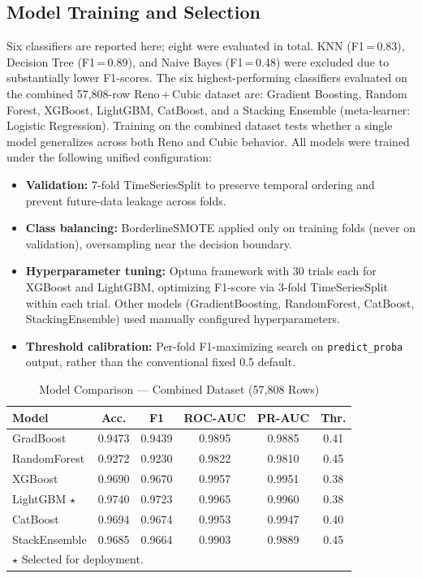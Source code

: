 \documentclass[journal]{IEEEtran}
\begin{document}
\subsection{Model Training and Selection}

Six classifiers are reported here; eight were evaluated in total. KNN (F1\,=\,0.83), Decision Tree (F1\,=\,0.89), and Naive Bayes (F1\,=\,0.48) were excluded due to substantially lower F1-scores. The six highest-performing classifiers evaluated on the combined 57,808-row Reno\,+\,Cubic dataset are: Gradient Boosting, Random Forest, XGBoost, LightGBM, CatBoost, and a Stacking Ensemble (meta-learner: Logistic Regression). Training on the combined dataset tests whether a single model generalizes across both Reno and Cubic behavior. All models were trained under the following unified configuration:

\begin{itemize}
  \item \textbf{Validation:} 7-fold TimeSeriesSplit to preserve temporal ordering and prevent future-data leakage across folds.
  \item \textbf{Class balancing:} BorderlineSMOTE applied only on training folds (never on validation), oversampling near the decision boundary.
  \item \textbf{Hyperparameter tuning:} Optuna framework with 30 trials each for XGBoost and LightGBM, optimizing F1-score via 3-fold TimeSeriesSplit within each trial. Other models (GradientBoosting, RandomForest, CatBoost, StackingEnsemble) used manually configured hyperparameters.
  \item \textbf{Threshold calibration:} Per-fold F1-maximizing search on \texttt{predict\_proba} output, rather than the conventional fixed 0.5 default.
\end{itemize}

\begin{table}[!t]
\renewcommand{\arraystretch}{1.3}
\caption{Model Comparison --- Combined Dataset (57,808 Rows)}
\label{tab:models}
\centering
\begin{tabular}{lccccc}
\toprule
\textbf{Model} & \textbf{Acc.} & \textbf{F1} & \textbf{ROC-AUC} & \textbf{PR-AUC} & \textbf{Thr.} \\
\midrule
GradBoost      & 0.9473 & 0.9439 & 0.9895 & 0.9885 & 0.41 \\
RandomForest   & 0.9272 & 0.9230 & 0.9822 & 0.9810 & 0.45 \\
XGBoost        & 0.9690 & 0.9670 & 0.9957 & 0.9951 & 0.38 \\
LightGBM $\star$ & 0.9740 & 0.9723 & 0.9965 & 0.9960 & 0.38 \\
CatBoost       & 0.9694 & 0.9674 & 0.9953 & 0.9947 & 0.40 \\
StackEnsemble  & 0.9685 & 0.9664 & 0.9903 & 0.9889 & 0.45 \\
\bottomrule
\multicolumn{6}{l}{$\star$ Selected for deployment.}
\end{tabular}
\end{table}
\end{document}

